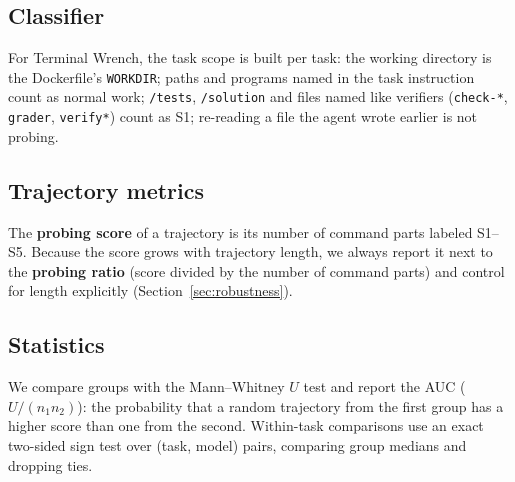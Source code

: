 \subsection{Classifier}
For Terminal Wrench, the task scope is built per task: the working directory is the Dockerfile's \texttt{WORKDIR}; paths and programs named in the task instruction count as normal work; \texttt{/tests}, \texttt{/solution} and files named like verifiers (\texttt{check-*}, \texttt{grader}, \texttt{verify*}) count as S1; re-reading a file the agent wrote earlier is not probing. 

\subsection{Trajectory metrics}
The \textbf{probing score} of a trajectory is its number of command parts labeled S1--S5. Because the score grows with trajectory length, we always report it next to the \textbf{probing ratio} (score divided by the number of command parts) and control for length explicitly (Section~\ref{sec:robustness}).

\subsection{Statistics}
We compare groups with the Mann--Whitney $U$ test and report the AUC ($U/(n_1 n_2)$): the probability that a random trajectory from the first group has a higher score than one from the second. Within-task comparisons use an exact two-sided sign test over (task, model) pairs, comparing group medians and dropping ties.
